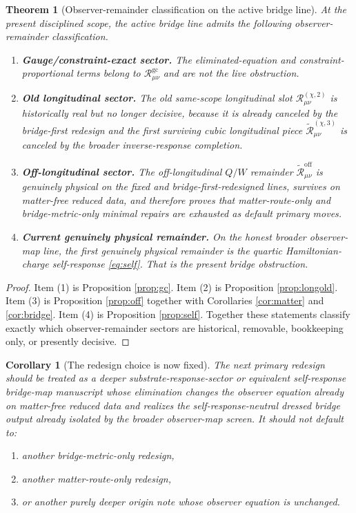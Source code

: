 \documentclass[11pt]{article}
\newcommand{\RemGC}{\mathcal R_{\mu\nu}^{\mathrm{gc}}}
\newcommand{\RemLongOld}{\mathcal R_{\mu\nu}^{(\chi,2)}}
\newcommand{\RemOff}{\widetilde{\mathcal R}_{\mu\nu}^{\mathrm{off}}}
\newcommand{\RemLongThree}{\widetilde{\mathcal R}_{\mu\nu}^{(\chi,3)}}
\newtheorem{corollary}{Corollary}
\newtheorem{theorem}{Theorem}
\begin{document}
\begin{theorem}[Observer-remainder classification on the active bridge line]
\label{thm:classification}
At the present disciplined scope, the active bridge line admits the following observer-remainder classification.
\begin{enumerate}
    \item \textbf{Gauge/constraint-exact sector.} The eliminated-equation and constraint-proportional terms belong to \(\RemGC\) and are not the live obstruction.
    \item \textbf{Old longitudinal sector.} The old same-scope longitudinal slot \(\RemLongOld\) is historically real but no longer decisive, because it is already canceled by the bridge-first redesign and the first surviving cubic longitudinal piece \(\RemLongThree\) is canceled by the broader inverse-response completion.
    \item \textbf{Off-longitudinal sector.} The off-longitudinal \(Q/W\) remainder \(\RemOff\) is genuinely physical on the fixed and bridge-first-redesigned lines, survives on matter-free reduced data, and therefore proves that matter-route-only and bridge-metric-only minimal repairs are exhausted as default primary moves.
    \item \textbf{Current genuinely physical remainder.} On the honest broader observer-map line, the first genuinely physical remainder is the quartic Hamiltonian-charge self-response \eqref{eq:self}. That is the present bridge obstruction.
\end{enumerate}
\end{theorem}

\begin{proof}
Item (1) is Proposition \ref{prop:gc}. Item (2) is Proposition \ref{prop:longold}. Item (3) is Proposition \ref{prop:off} together with Corollaries \ref{cor:matter} and \ref{cor:bridge}. Item (4) is Proposition \ref{prop:self}. Together these statements classify exactly which observer-remainder sectors are historical, removable, bookkeeping only, or presently decisive.
\end{proof}

\begin{corollary}[The redesign choice is now fixed]
\label{cor:choice}
The next primary redesign should be treated as a deeper substrate-response-sector or equivalent self-response bridge-map manuscript whose elimination changes the observer equation already on matter-free reduced data and realizes the self-response-neutral dressed bridge output already isolated by the broader observer-map screen. It should not default to:
\begin{enumerate}
    \item another bridge-metric-only redesign,
    \item another matter-route-only redesign,
    \item or another purely deeper origin note whose observer equation is unchanged.
\end{enumerate}
\end{corollary}
\end{document}
